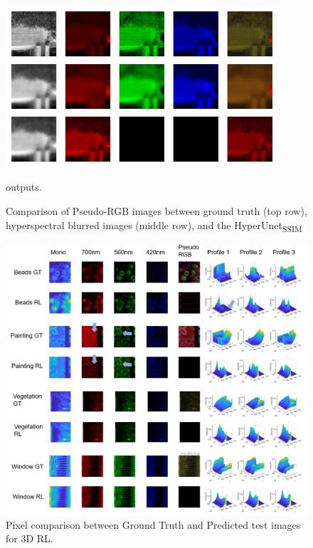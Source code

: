 \documentclass{article}
\begin{document}
\begin{figure}[!h]
\centering
\includegraphics[width=0.9\textwidth]{figs/ClassicUnetSSIM_LR/pixel_comparison/4423_test3_ssim.png}
    \caption{Comparison of Pseudo-RGB images between ground truth (top row), hyperspectral blurred images (middle row), and the HyperUnet\textsubscript{SSIM}} outputs.
    \label{fig:degeneration_mode}
\end{figure}

\begin{figure}[!htb]
    \centering
\includegraphics[width=\textwidth]{figs/RL/RLcompare.png}
    \caption{Pixel comparison between Ground Truth and Predicted test images for 3D RL.}
    \label{fig:RLCompare}
\end{figure}
\end{document}
